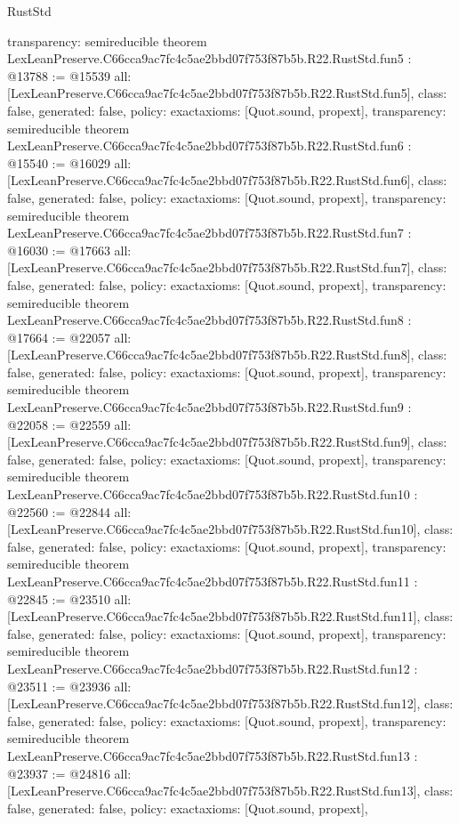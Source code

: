 \begin{lexlean}{RustStd}
\begin{coremodule}
{  transparency: semireducible
}
theorem LexLeanPreserve.C66cca9ac7fc4c5ae2bbd07f753f87b5b.R22.RustStd.fun5 : @13788 := @15539 {
  all: [LexLeanPreserve.C66cca9ac7fc4c5ae2bbd07f753f87b5b.R22.RustStd.fun5],
  class: false,
  generated: false,
  policy: exact{axioms: [Quot.sound, propext]},
  transparency: semireducible
}
theorem LexLeanPreserve.C66cca9ac7fc4c5ae2bbd07f753f87b5b.R22.RustStd.fun6 : @15540 := @16029 {
  all: [LexLeanPreserve.C66cca9ac7fc4c5ae2bbd07f753f87b5b.R22.RustStd.fun6],
  class: false,
  generated: false,
  policy: exact{axioms: [Quot.sound, propext]},
  transparency: semireducible
}
theorem LexLeanPreserve.C66cca9ac7fc4c5ae2bbd07f753f87b5b.R22.RustStd.fun7 : @16030 := @17663 {
  all: [LexLeanPreserve.C66cca9ac7fc4c5ae2bbd07f753f87b5b.R22.RustStd.fun7],
  class: false,
  generated: false,
  policy: exact{axioms: [Quot.sound, propext]},
  transparency: semireducible
}
theorem LexLeanPreserve.C66cca9ac7fc4c5ae2bbd07f753f87b5b.R22.RustStd.fun8 : @17664 := @22057 {
  all: [LexLeanPreserve.C66cca9ac7fc4c5ae2bbd07f753f87b5b.R22.RustStd.fun8],
  class: false,
  generated: false,
  policy: exact{axioms: [Quot.sound, propext]},
  transparency: semireducible
}
theorem LexLeanPreserve.C66cca9ac7fc4c5ae2bbd07f753f87b5b.R22.RustStd.fun9 : @22058 := @22559 {
  all: [LexLeanPreserve.C66cca9ac7fc4c5ae2bbd07f753f87b5b.R22.RustStd.fun9],
  class: false,
  generated: false,
  policy: exact{axioms: [Quot.sound, propext]},
  transparency: semireducible
}
theorem LexLeanPreserve.C66cca9ac7fc4c5ae2bbd07f753f87b5b.R22.RustStd.fun10 : @22560 := @22844 {
  all: [LexLeanPreserve.C66cca9ac7fc4c5ae2bbd07f753f87b5b.R22.RustStd.fun10],
  class: false,
  generated: false,
  policy: exact{axioms: [Quot.sound, propext]},
  transparency: semireducible
}
theorem LexLeanPreserve.C66cca9ac7fc4c5ae2bbd07f753f87b5b.R22.RustStd.fun11 : @22845 := @23510 {
  all: [LexLeanPreserve.C66cca9ac7fc4c5ae2bbd07f753f87b5b.R22.RustStd.fun11],
  class: false,
  generated: false,
  policy: exact{axioms: [Quot.sound, propext]},
  transparency: semireducible
}
theorem LexLeanPreserve.C66cca9ac7fc4c5ae2bbd07f753f87b5b.R22.RustStd.fun12 : @23511 := @23936 {
  all: [LexLeanPreserve.C66cca9ac7fc4c5ae2bbd07f753f87b5b.R22.RustStd.fun12],
  class: false,
  generated: false,
  policy: exact{axioms: [Quot.sound, propext]},
  transparency: semireducible
}
theorem LexLeanPreserve.C66cca9ac7fc4c5ae2bbd07f753f87b5b.R22.RustStd.fun13 : @23937 := @24816 {
  all: [LexLeanPreserve.C66cca9ac7fc4c5ae2bbd07f753f87b5b.R22.RustStd.fun13],
  class: false,
  generated: false,
  policy: exact{axioms: [Quot.sound, propext]},
}
\end{coremodule}
\end{lexlean}
